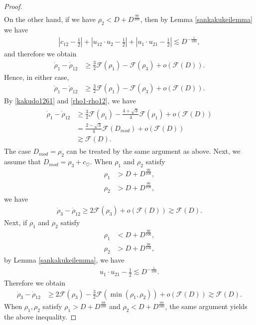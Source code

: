 \documentclass[reqno]{amsart}
\theoremstyle{plain}
\theoremstyle{definition}
\numberwithin{equation}{section}
\newcommand{\1}{\mathbbm{1}}
\begin{document}
\begin{proof}
\begin{align*}
\end{align*}
On the other hand, if we have $\rho_2<D+D^{\frac{99}{100}}$, then by Lemma \ref{sankakukeilemma} we have
\begin{align*}
\left|c_{12}-\frac{1}{2}\right|+\left|u_{12}\cdot u_2-\frac{1}{2}\right|+\left|u_1\cdot u_{21}-\frac{1}{2}\right|\lesssim D^{-\frac{1}{100}},
\end{align*}
and therefore we obtain
\begin{align*}
\dot{\rho}_1-\dot{\rho}_{12}&\geq \frac{3}{2}\mathcal{F}(\rho_1)-\mathcal{F}(\rho_3)+o\left(\mathcal{F}(D)\right).
\end{align*}
Hence, in either case,
\begin{align}\label{rho1-rho12}
\dot{\rho}_1-\dot{\rho}_{12}&\geq \frac{3}{2}\mathcal{F}(\rho_1)-\mathcal{F}(\rho_3)+o\left(\mathcal{F}(D)\right).
\end{align}
By \eqref{kakudo1261} and \eqref{rho1-rho12}, we have
\begin{align}\label{rho1minnnotoki}
\begin{aligned}
\dot{\rho}_1-\dot{\rho}_{12}&\geq\frac{3}{2}\mathcal{F}(\rho_1)-\frac{4+\sqrt{3}}{4}\mathcal{F}(\rho_1)+o\left(\mathcal{F}(D)\right)
\\
&=\frac{2-\sqrt{3}}{4}\mathcal{F}(D_{mod})+o\left(\mathcal{F}(D)\right)
\\
&\gtrsim \mathcal{F}(D).
\end{aligned}
\end{align}
The case $D_{mod}=\rho_2$ can be treated by the same argument as above. Next, we assume that $D_{mod}=\rho_3+c_{\heartsuit}$. When $\rho_1$ and $\rho_2$ satisfy
\begin{align*}
\rho_1&>D+D^{\frac{99}{100}},
\\
\rho_2&>D+D^{\frac{99}{100}},
\end{align*}
we have
\begin{align*}
\dot{\rho}_3-\dot{\rho}_{12}\geq 2\mathcal{F}(\rho_3)+o\left(\mathcal{F}(D)\right)\gtrsim \mathcal{F}(D).
\end{align*}
Next, if $\rho_1$ and $\rho_2$ satisfy 
\begin{align*}
\rho_1&<D+D^{\frac{99}{100}},
\\
\rho_2&>D+D^{\frac{99}{100}},
\end{align*}
by Lemma \ref{sankakukeilemma}, we have
\begin{align*}
u_1\cdot u_{21}-\frac{1}{2}\lesssim D^{-\frac{1}{100}}.
\end{align*}
Therefore we obtain
\begin{align*}
\dot{\rho}_3-\dot{\rho}_{12}&\geq 2\mathcal{F}(\rho_3)-\frac{3}{2}\mathcal{F}(\min{(\rho_1,\rho_2)})+o\left(\mathcal{F}(D)\right)\gtrsim \mathcal{F}(D).
\end{align*}
When $\rho_1, \rho_2$ satisfy $\rho_1>D+D^{\frac{99}{100}}$ and $\rho_2<D+D^{\frac{99}{100}}$, the same argument yields the above inequality.


\end{proof}
\end{document}
